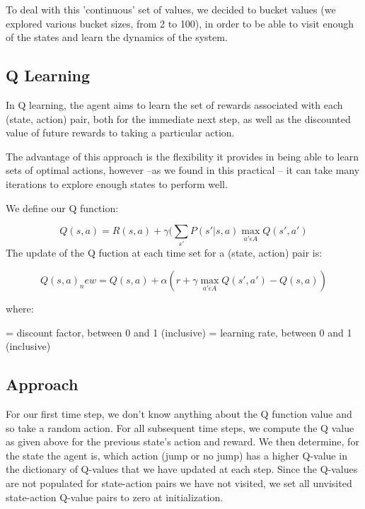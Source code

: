 \documentclass[11pt, oneside]{article}   	%
\begin{document}
\newline 

To deal with this 'continuous' set of values, we decided to bucket values (we explored various bucket sizes, from 2 to 100), in order to be able to visit enough of the states and learn the dynamics of the system.

\subsection*{Q Learning}

In Q learning, the agent aims to learn the set of rewards associated with each (state, action) pair, both for the immediate next step, as well as the discounted value of future rewards to taking a particular action.

\newline 
The advantage of this approach is the flexibility it provides in being able to learn sets of optimal actions, however --as we found in this practical -- it can take many iterations to explore enough states to perform well.

We define our Q function:
\newline

\begin{equation}\label{reio}
Q(s,a) = R(s,a) +  \gamma (\sum_{s \prime} P(s\prime | s, a) \max_{a\prime \epsilon A} Q(s \prime, a \prime)
\end{equation}
\newline
The update of the Q fuction at each time set for a (state, action) pair is:

\begin{equation}\label{reio}
Q(s,a)_new = Q(s,a) +  \alpha (r + \gamma \max_{a\prime \epsilon A} Q(s \prime, a \prime) - Q(s,a))
\end{equation}


\newline
where:

\newline
\gamma = discount factor, between 0 and 1 (inclusive)
\newline
\alpha = learning rate, between 0 and 1 (inclusive)
\newline

\subsection*{Approach}

For our first time step, we don't know anything about the Q function value and so take a random action.
\newline
For all subsequent time steps, we compute the Q value as given above for the previous state's action and reward. We then determine, for the state the agent is, which action (jump or no jump) has a higher Q-value in the dictionary of Q-values that we have updated at each step.
\newline
Since the Q-values are not populated for state-action pairs we have not visited, we set all unvisited state-action Q-value pairs to zero at initialization.
\end{document}
